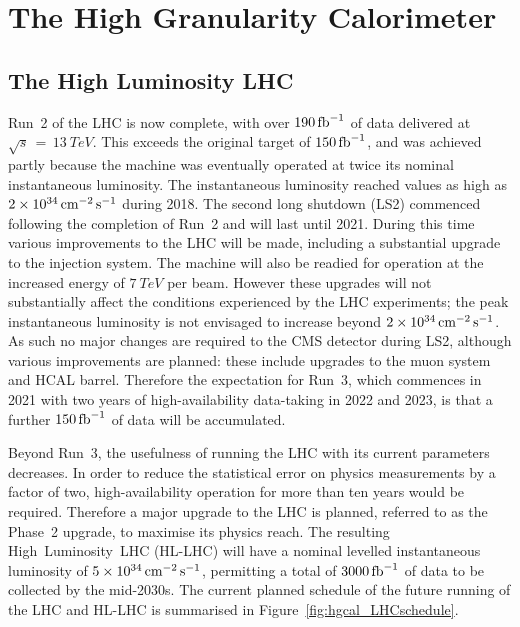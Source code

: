\chapter{The High Granularity Calorimeter}
\label{chap:hgcal}

\section{The High Luminosity LHC}

Run~2 of the LHC is now complete, with over $\SI{190}{\ensuremath{\textrm{fb}^{-1}}}$ of data delivered at $\sqrt{s}\,=\,\SI{13}{TeV}$. %
This exceeds the original target of $\SI{150}{\ensuremath{\textrm{fb}^{-1}}}$, and was achieved partly because the machine was eventually operated at twice its nominal instantaneous luminosity.
The instantaneous luminosity reached values as high as $\SI{2e34}{\ensuremath{\textrm{cm}^{-2}\,\textrm{s}^{-1}}}$ during 2018.
The second long shutdown (LS2) commenced following the completion of Run~2 and will last until 2021.
During this time various improvements to the LHC will be made, including a substantial upgrade to the injection system.
The machine will also be readied for operation at the increased energy of $\SI{7}{TeV}$ per beam.
However these upgrades will not substantially affect the conditions experienced by the LHC experiments; 
the peak instantaneous luminosity is not envisaged to increase beyond $\SI{2e34}{\ensuremath{\textrm{cm}^{-2}\,\textrm{s}^{-1}}}$.
As such no major changes are required to the CMS detector during LS2, although various improvements are planned: 
these include upgrades to the muon system and HCAL barrel.
Therefore the expectation for Run~3, which commences in 2021 with two years of high-availability data-taking in 2022 and 2023, 
is that a further $\SI{150}{\ensuremath{\textrm{fb}^{-1}}}$ of data will be accumulated. 

Beyond Run~3, the usefulness of running the LHC with its current parameters decreases.
In order to reduce the statistical error on physics measurements by a factor of two, high-availability operation for more than ten years would be required.
Therefore a major upgrade to the LHC is planned, referred to as the Phase~2 upgrade, to maximise its physics reach. 
The resulting High~Luminosity~LHC (HL-LHC) \cite{HLLHC} will have a nominal levelled instantaneous luminosity of $\SI{5e34}{\ensuremath{\textrm{cm}^{-2}\,\textrm{s}^{-1}}}$, 
permitting a total of $\SI{3000}{\ensuremath{\textrm{fb}^{-1}}}$ of data to be collected by the mid-2030s.
The current planned schedule of the future running of the LHC and HL-LHC is summarised in Figure~\ref{fig:hgcal_LHCschedule}.

